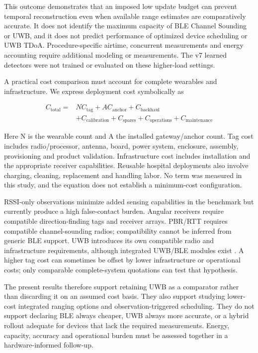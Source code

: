 \documentclass[12pt,a4paper]{report}
\begin{document}
This outcome demonstrates that an imposed low update budget can prevent temporal reconstruction even when available range estimates are comparatively accurate. It does not identify the maximum capacity of BLE Channel Sounding or UWB, and it does not predict performance of optimized device scheduling or UWB TDoA. Procedure-specific airtime, concurrent measurements and energy accounting require additional modeling or measurements. The v7 learned detectors were not trained or evaluated on these higher-load settings.

A practical cost comparison must account for complete wearables and infrastructure. We express deployment cost symbolically as

\begin{equation}
\begin{aligned}C_{\mathrm{total}}={}&NC_{\mathrm{tag}}+AC_{\mathrm{anchor}}+C_{\mathrm{backhaul}}\\&+C_{\mathrm{calibration}}+C_{\mathrm{spares}}+C_{\mathrm{operations}}+C_{\mathrm{maintenance}}\end{aligned}
\label{eq:source11}
\end{equation}

Here N is the wearable count and A the installed gateway/anchor count. Tag cost includes radio/processor, antenna, board, power system, enclosure, assembly, provisioning and product validation. Infrastructure cost includes installation and the appropriate receiver capabilities. Reusable hospital deployments also involve charging, cleaning, replacement and handling labor. No term was measured in this study, and the equation does not establish a minimum-cost configuration.

RSSI-only observations minimize added sensing capabilities in the benchmark but currently produce a high false-contact burden. Angular receivers require compatible direction-finding tags and receiver arrays. PBR/RTT requires compatible channel-sounding radios; compatibility cannot be inferred from generic BLE support. UWB introduces its own compatible radio and infrastructure requirements, although integrated UWB/BLE modules exist \cite{ref12}. A higher tag cost can sometimes be offset by lower infrastructure or operational costs; only comparable complete-system quotations can test that hypothesis.

The present results therefore support retaining UWB as a comparator rather than discarding it on an assumed cost basis. They also support studying lower-cost integrated ranging options and observation-triggered scheduling. They do not support declaring BLE always cheaper, UWB always more accurate, or a hybrid rollout adequate for devices that lack the required measurements. Energy, capacity, accuracy and operational burden must be assessed together in a hardware-informed follow-up.
\end{document}
